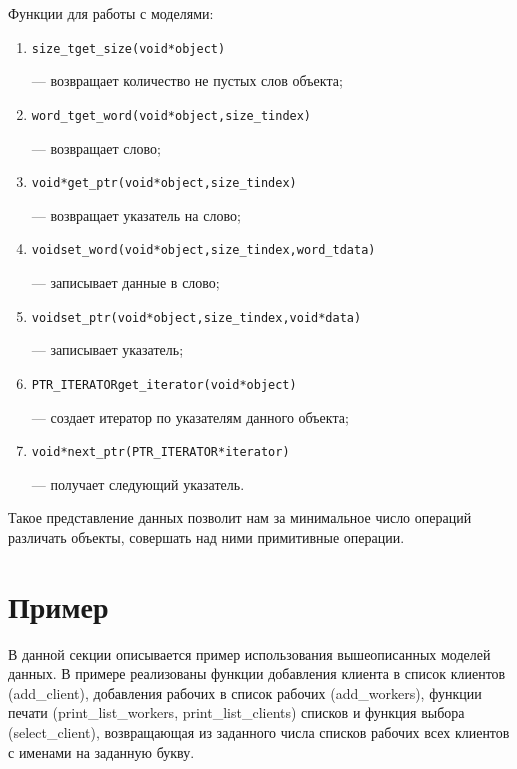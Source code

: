\documentclass[12pt,a4paper]{article}
\begin{document}
Функции для работы с моделями:
\begin{enumerate}
\item \begin{alltt} size\_t get\_size(void * object) \end{alltt} — возвращает количество не пустых слов объекта; 
\item \begin{alltt}  word\_t get\_word(void * object, size\_t index)\end{alltt} — возвращает слово;
\item \begin{alltt} void * get\_ptr (void * object, size\_t index) \end{alltt} — возвращает указатель на слово;
\item \begin{alltt} void   set\_word(void * object, size\_t index, word\_t data)\end{alltt}  — записывает данные в слово;
\item \begin{alltt} void   set\_ptr (void * object, size\_t index, void* data)\end{alltt}   — записывает указатель;
\item \begin{alltt} PTR\_ITERATOR get\_iterator (void * object)\end{alltt} — создает итератор по указателям данного объекта;
\item \begin{alltt} void * next\_ptr(PTR\_ITERATOR * iterator) \end{alltt} — получает следующий указатель.
\end{enumerate}
Такое представление данных позволит нам за минимальное число операций различать объекты, совершать над ними примитивные операции.


\newpage
\section{Пример}
В данной секции описывается пример использования вышеописанных моделей данных.
В примере реализованы функции добавления клиента в список клиентов (add\_client), добавления рабочих в список рабочих (add\_workers), функции печати (print\_list\_workers, print\_list\_clients) списков и функция выбора (select\_client),
возвращающая из заданного числа списков рабочих всех клиентов с именами на заданную букву.  
\end{document}
